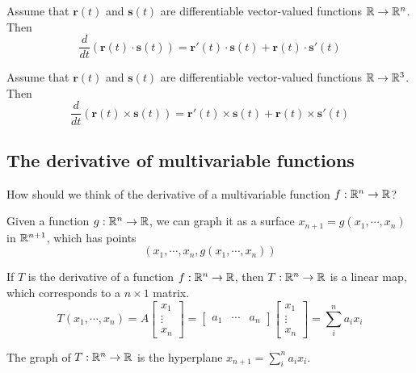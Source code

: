 \begin{theorem}
       Assume that $\bm{r}(t)$ and $\bm{s}(t)$ are differentiable vector-valued functions $\mathbb{R} \to \mathbb{R}^n$. Then
       $$\frac{d}{dt}(\bm{r}(t) \cdot \bm{s}(t)) = \bm{r}'(t)\cdot\bm{s}(t) + \bm{r}(t)\cdot\bm{s}'(t)$$ 
    \end{theorem}
    
       
    \begin{theorem}
       Assume that $\bm{r}(t)$ and $\bm{s}(t)$ are differentiable vector-valued functions $\mathbb{R} \to \mathbb{R}^3$. Then 
       $$\frac{d}{dt}(\bm{r}(t) \times \bm{s}(t)) = \bm{r}'(t)\times \bm{s}(t) + \bm{r}(t)\times \bm{s}'(t)$$
    \end{theorem}

\subsection{The derivative of multivariable functions}

\begin{motivating}
    How should we think of the derivative of a multivariable function $f: \mathbb{R}^n \to \mathbb{R}$?
    \end{motivating}

Given a function $g: \mathbb{R}^n \to \mathbb{R}$, we can graph it as a surface $x_{n+1} = g(x_1, \cdots, x_n)$ in $\mathbb{R}^{n+1}$, which has points $$(x_1,\cdots, x_n, g(x_1, \cdots, x_n))$$
    
    
    If $T$ is the derivative of a function $f: \mathbb{R}^n \to \mathbb{R}$, then $T : \mathbb{R}^n \to \mathbb{R}$ is a linear map, which corresponds to a $n \times 1$ matrix.
    \begin{equation*}
T(x_1, \cdots, x_n) = A\begin{bmatrix}
x_1 \\
\vdots\\
x_n
\end{bmatrix}
=
\begin{bmatrix}
a_1 & \cdots & a_n
\end{bmatrix}\begin{bmatrix}
x_1 \\
\vdots\\
x_n
\end{bmatrix}
= \sum_i^n a_ix_i
\end{equation*}

\begin{proposition}
The graph of $T : \mathbb{R}^n \to \mathbb{R}$ is the hyperplane $x_{n+1} = \sum_i^n a_ix_i$.
\end{proposition}

